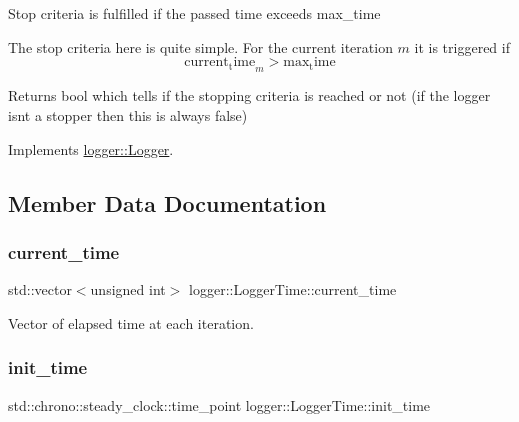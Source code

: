 Stop criteria is fulfilled if the passed time exceeds {\ttfamily max\+\_\+time} 

The stop criteria here is quite simple. For the current iteration $m$ it is triggered if \[ \mathrm{current_time}_m > \mathrm{max_time} \]

\begin{DoxyReturn}{Returns}
{\ttfamily bool} which tells if the stopping criteria is reached or not (if the logger isn\textquotesingle{}t a stopper then this is always false) 
\end{DoxyReturn}


Implements \hyperlink{classlogger_1_1_logger_aed91421c07062b91cee158ef2bda7ae8}{logger\+::\+Logger}.



\subsection{Member Data Documentation}
\mbox{\label{classlogger_1_1_logger_time_a9c26fbdef41cacef1e7f630839f3a4d2}} 
\subsubsection{\texorpdfstring{current\+\_\+time}{current\_time}}
{\footnotesize\ttfamily std\+::vector$<$unsigned int$>$ logger\+::\+Logger\+Time\+::current\+\_\+time\hspace{0.3cm}{\ttfamily [private]}}



Vector of elapsed time at each iteration. 

\mbox{\label{classlogger_1_1_logger_time_ace1b159544a0120633c506d36e0d22e0}} 
\subsubsection{\texorpdfstring{init\+\_\+time}{init\_time}}
{\footnotesize\ttfamily std\+::chrono\+::steady\+\_\+clock\+::time\+\_\+point logger\+::\+Logger\+Time\+::init\+\_\+time\hspace{0.3cm}{\ttfamily [private]}}



